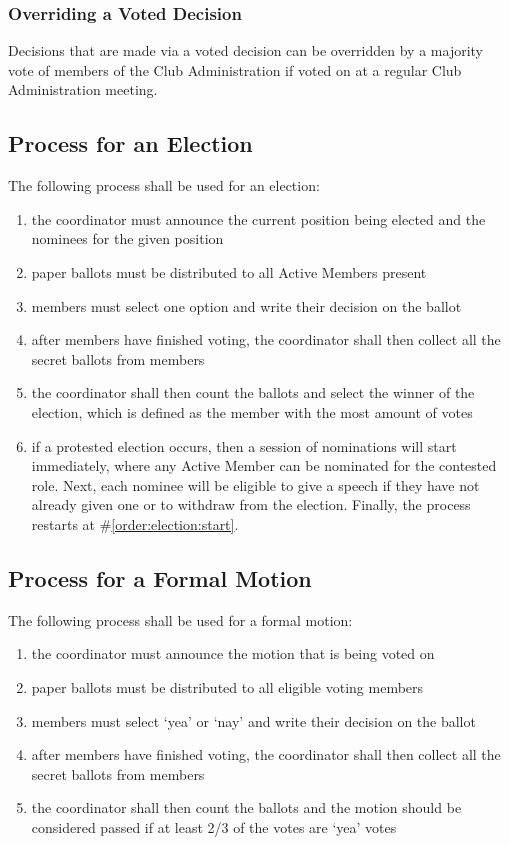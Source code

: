 \documentclass[english,11pt]{article}
\begin{document}
\subsubsection{Overriding a Voted Decision} \label{subsect:decision:voted:override}
Decisions that are made via a voted decision can be overridden by a majority vote of members of the Club Administration if voted on at a regular Club Administration meeting.

\subsection{Process for an Election} \label{sect:decision:election}
The following process shall be used for an election:

\begin{enumerate}
    \item \label{order:election:start} the coordinator must announce the current position being elected and the nominees for the given position
    \item paper ballots must be distributed to all Active Members present
    \item members must select one option and write their decision on the ballot
    \item after members have finished voting, the coordinator shall then collect all the secret ballots from members
    \item the coordinator shall then count the ballots and select the winner of the election, which is defined as the member with the most amount of votes
    \item \label{order:election:protested} if a protested election occurs, then a session of nominations will start immediately, where any Active Member can be nominated for the contested role.
        Next, each nominee will be eligible to give a speech if they have not already given one or to withdraw from the election.
        Finally, the process restarts at \#\ref{order:election:start}.
\end{enumerate}

\subsection{Process for a Formal Motion} \label{sect:decision:formal-motion}
The following process shall be used for a formal motion:

\begin{enumerate}
    \item the coordinator must announce the motion that is being voted on
    \item paper ballots must be distributed to all eligible voting members
    \item members must select `yea' or `nay' and write their decision on the ballot
    \item after members have finished voting, the coordinator shall then collect all the secret ballots from members
    \item the coordinator shall then count the ballots and the motion should be considered passed if at least 2/3 of the votes are `yea' votes
\end{enumerate}
\end{document}
